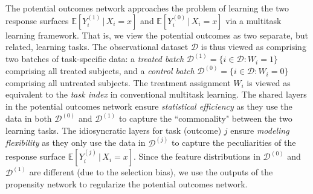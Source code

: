 \documentclass{article}
\begin{document}
The potential outcomes network approaches the problem of learning the two response surfaces $\mathbb{E}[Y^{(1)}_i\,|\,X_i = x]$ and $\mathbb{E}[Y^{(0)}_i\,|\,X_i = x]$ via a multitask learning framework. That is, we view the potential outcomes as two separate, but related, learning tasks. The observational dataset $\mathcal{D}$ is thus viewed as comprising two batches of task-specific data: a {\it treated batch} $\mathcal{D}^{(1)}=\{i \in \mathcal{D}: W_i = 1\}$ comprising all treated subjects, and a {\it control batch} $\mathcal{D}^{(0)}=\{i \in \mathcal{D}: W_i = 0\}$ comprising all untreated subjects. The treatment assignment $W_i$ is viewed as equivalent to the {\it task index} in conventional multitask learning. The shared layers in the potential outcomes network ensure {\it statistical efficiency} as they use the data in both $\mathcal{D}^{(0)}$ and $\mathcal{D}^{(1)}$ to capture the ``commonality" between the two learning tasks. The idiosyncratic layers for task (outcome) $j$ ensure {\it modeling flexibility} as they only use the data in $\mathcal{D}^{(j)}$ to capture the peculiarities of the response surface $\mathbb{E}[Y^{(j)}_i\,|\,X_i = x]$. Since the feature distributions in $\mathcal{D}^{(0)}$ and $\mathcal{D}^{(1)}$ are different (due to the selection bias), we use the outputs of the propensity network to regularize the potential outcomes network.        
  
\end{document}
